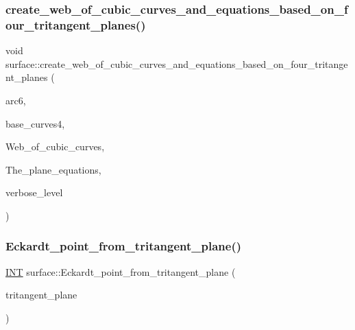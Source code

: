 \subsubsection{\texorpdfstring{create\+\_\+web\+\_\+of\+\_\+cubic\+\_\+curves\+\_\+and\+\_\+equations\+\_\+based\+\_\+on\+\_\+four\+\_\+tritangent\+\_\+planes()}{create\_web\_of\_cubic\_curves\_and\_equations\_based\_on\_four\_tritangent\_planes()}}
{\footnotesize\ttfamily void surface\+::create\+\_\+web\+\_\+of\+\_\+cubic\+\_\+curves\+\_\+and\+\_\+equations\+\_\+based\+\_\+on\+\_\+four\+\_\+tritangent\+\_\+planes (\begin{DoxyParamCaption}\item[{\mbox{\hyperlink{galois_8h_a09fddde158a3a20bd2dcadb609de11dc}{I\+NT}} $\ast$}]{arc6,  }\item[{\mbox{\hyperlink{galois_8h_a09fddde158a3a20bd2dcadb609de11dc}{I\+NT}} $\ast$}]{base\+\_\+curves4,  }\item[{\mbox{\hyperlink{galois_8h_a09fddde158a3a20bd2dcadb609de11dc}{I\+NT}} $\ast$\&}]{Web\+\_\+of\+\_\+cubic\+\_\+curves,  }\item[{\mbox{\hyperlink{galois_8h_a09fddde158a3a20bd2dcadb609de11dc}{I\+NT}} $\ast$\&}]{The\+\_\+plane\+\_\+equations,  }\item[{\mbox{\hyperlink{galois_8h_a09fddde158a3a20bd2dcadb609de11dc}{I\+NT}}}]{verbose\+\_\+level }\end{DoxyParamCaption})}

\mbox{\label{classsurface_a98178b6ac99b77aebc0d79a32d43df26}} 
\subsubsection{\texorpdfstring{Eckardt\+\_\+point\+\_\+from\+\_\+tritangent\+\_\+plane()}{Eckardt\_point\_from\_tritangent\_plane()}}
{\footnotesize\ttfamily \mbox{\hyperlink{galois_8h_a09fddde158a3a20bd2dcadb609de11dc}{I\+NT}} surface\+::\+Eckardt\+\_\+point\+\_\+from\+\_\+tritangent\+\_\+plane (\begin{DoxyParamCaption}\item[{\mbox{\hyperlink{galois_8h_a09fddde158a3a20bd2dcadb609de11dc}{I\+NT}} $\ast$}]{tritangent\+\_\+plane }\end{DoxyParamCaption})}

